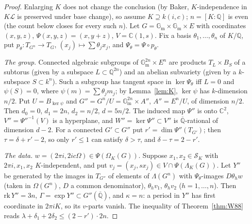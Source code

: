 \documentclass[11pt]{amsart}
\theoremstyle{definition}
\newcommand{\Qb}{\overline{\mathbb{Q}}}
\newcommand{\C}{\mathbb{C}}
\newcommand{\Q}{\mathbb{Q}}
\newcommand{\Gm}{\mathbb{G}_{\mathrm m}}
\newcommand{\Lg}{\mathcal{L}}
\begin{document}
\begin{proof}
Enlarging $K$ does not change the conclusion (by Baker, $K$-independence in $K\Lg$ is preserved under base change), so
assume $K\supseteq k(i,c)$; $n=[K:\Q]$ is even (the count below closes for every such $n$). Let $G=\Gm\times\Gm\times E$ with coordinates
$(x,y,z)$, $\Psi(x,y,z)=(x,y+z)$, $V=\C(1,s)$. Fix a basis $\theta_1,\dots,\theta_n$ of $K/\Q$, put
$p_\theta\colon T_{G^n}\to T_G$, $(x_j)\mapsto\sum\theta_jx_j$, and $\Psi_\theta=\Psi\circ p_\theta$.

\emph{The group.} Connected algebraic subgroups of $\Gm^{2n}\times E^n$ are products $T_L\times B_S$ of a subtorus
(given by a subspace $L\subset\Q^{2n}$) and an abelian subvariety (given by a $k$-subspace $S\subset k^n$). Such a
subgroup has tangent space in $\ker\Psi_\theta$ iff $L=0$ and $\psi(S)=0$, where $\psi(m)=\sum\theta_jm_j$; by
Lemma~\ref{lem:K}, $\ker\psi$ has $k$-dimension $n/2$. Put $U=B_{\ker\psi}$ and
$G''=G^n/U=\Gm^{2n}\times A''$, $A''=E^n/U$, of dimension $n/2$. Then $d_0=0$, $d_1=2n$, $d_2=n/2$, $d=5n/2$. The induced
map $\Psi''$ is onto $\C^2$, $V''=\Psi''^{-1}(V)$ is a hyperplane, and $W''=\ker\Psi''\subset V''$ is $\Qb$-rational of
dimension $d-2$. For a connected $G'\subset G''$ put $r'=\dim\Psi''(T_{G'})$; then $\tau=\delta+r'-2$, so only $r'\le1$
can satisfy $\delta>\tau$, and $\delta-\tau=2-r'$.

\emph{The data.} $w=(2\pi i,2ic\Omega)\in\Psi(\Omega_K(G))$. Suppose $x_1,x_2\in\mathcal S_K$ with $2\pi i,x_1,x_2$
$K$-independent, and put $v_j=(x_j,sx_j)\in V\cap\Psi(\Lambda_K(G))$. Let $Y''$ be generated by the images in $T_{G''}$
of elements of $\Lambda(G^n)$ with $\Psi_\theta$-images $D\theta_hw$ (taken in $\Omega(G^n)$, $D$ a common denominator),
$\theta_hv_1$, $\theta_hv_2$ ($h=1,\dots,n$). Then $\mathrm{rk}\,Y''=3n$, $\Gamma=\exp Y''\subset G''(\Qb)$, and
$\kappa=n$: a period in $Y''$ has first coordinate in $2\pi iK$, so its $v$-parts vanish. The inequality of
Theorem~\ref{thm:W88} reads $\lambda+\delta_1+2\delta_2\le(2-r')\cdot2n$.


\end{proof}
\end{document}
